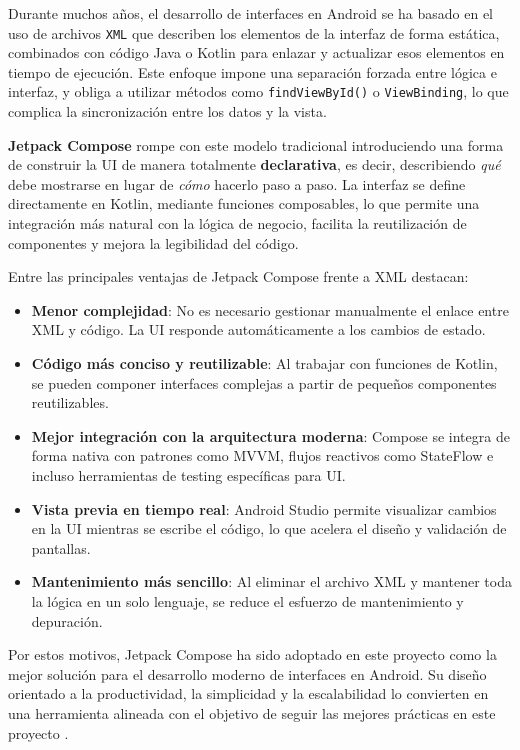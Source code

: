 Durante muchos años, el desarrollo de interfaces en Android se ha basado en el uso de archivos \texttt{XML} que describen los elementos de la interfaz de forma estática, combinados con código Java o Kotlin para enlazar y actualizar esos elementos en tiempo de ejecución. Este enfoque impone una separación forzada entre lógica e interfaz, y obliga a utilizar métodos como \texttt{findViewById()} o \texttt{ViewBinding}, lo que complica la sincronización entre los datos y la vista.

\textbf{Jetpack Compose} rompe con este modelo tradicional introduciendo una forma de construir la UI de manera totalmente \textbf{declarativa}, es decir, describiendo \textit{qué} debe mostrarse en lugar de \textit{cómo} hacerlo paso a paso. La interfaz se define directamente en Kotlin, mediante funciones composables, lo que permite una integración más natural con la lógica de negocio, facilita la reutilización de componentes y mejora la legibilidad del código.

Entre las principales ventajas de Jetpack Compose frente a XML destacan:

\begin{itemize}
    \item \textbf{Menor complejidad}: No es necesario gestionar manualmente el enlace entre XML y código. La UI responde automáticamente a los cambios de estado.

    \item \textbf{Código más conciso y reutilizable}: Al trabajar con funciones de Kotlin, se pueden componer interfaces complejas a partir de pequeños componentes reutilizables.

    \item \textbf{Mejor integración con la arquitectura moderna}: Compose se integra de forma nativa con patrones como MVVM, flujos reactivos como StateFlow e incluso herramientas de testing específicas para UI.

    \item \textbf{Vista previa en tiempo real}: Android Studio permite visualizar cambios en la UI mientras se escribe el código, lo que acelera el diseño y validación de pantallas.

    \item \textbf{Mantenimiento más sencillo}: Al eliminar el archivo XML y mantener toda la lógica en un solo lenguaje, se reduce el esfuerzo de mantenimiento y depuración.
\end{itemize}

Por estos motivos, Jetpack Compose ha sido adoptado en este proyecto como la mejor solución para el desarrollo moderno de interfaces en Android. Su diseño orientado a la productividad, la simplicidad y la escalabilidad lo convierten en una herramienta alineada con el objetivo de seguir las mejores prácticas en este proyecto \cite{jetpack}.



